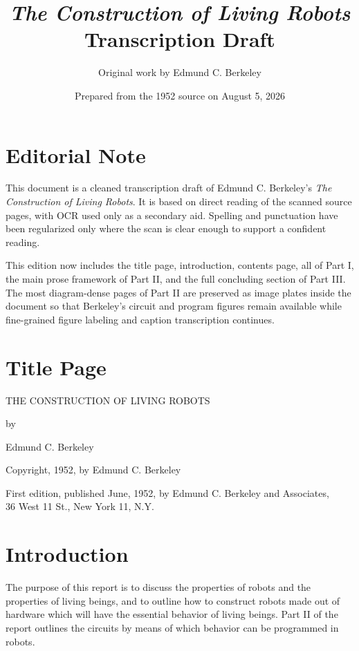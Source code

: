 \documentclass[11pt]{article}
\title{\emph{The Construction of Living Robots}\\\large Transcription Draft}
\author{Original work by Edmund C. Berkeley}
\date{Prepared from the 1952 source on August 5, 2026}
\begin{document}
\maketitle

\section*{Editorial Note}

This document is a cleaned transcription draft of Edmund C. Berkeley's
\emph{The Construction of Living Robots}. It is based on direct reading of the
scanned source pages, with OCR used only as a secondary aid. Spelling and
punctuation have been regularized only where the scan is clear enough to
support a confident reading.

This edition now includes the title page, introduction, contents page, all of
Part I, the main prose framework of Part II, and the full concluding section of
Part III. The most diagram-dense pages of Part II are preserved as image plates
inside the document so that Berkeley's circuit and program figures remain
available while fine-grained figure labeling and caption transcription
continues.

\section*{Title Page}

\begin{center}
\Large THE CONSTRUCTION OF LIVING ROBOTS

\normalsize
\vspace{1em}
by

Edmund C. Berkeley

\vspace{1em}
Copyright, 1952, by Edmund C. Berkeley

\vspace{1em}
First edition, published June, 1952, by Edmund C. Berkeley and Associates,\\
36 West 11 St., New York 11, N.Y.
\end{center}

\clearpage

\section*{Introduction}

The purpose of this report is to discuss the properties of robots and the
properties of living beings, and to outline how to construct robots made out of
hardware which will have the essential behavior of living beings. Part II of
the report outlines the circuits by means of which behavior can be programmed
in robots.
\end{document}
